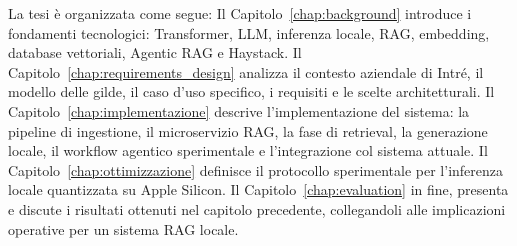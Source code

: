 La tesi è organizzata come segue: Il Capitolo~\ref{chap:background} introduce
i fondamenti tecnologici: Transformer, LLM, inferenza locale, RAG, embedding,
database vettoriali, Agentic RAG e Haystack. Il
Capitolo~\ref{chap:requirements_design} analizza il contesto aziendale di
Intré, il modello delle gilde, il caso d'uso specifico, i requisiti e le scelte
architetturali. Il Capitolo~\ref{chap:implementazione} descrive
l'implementazione del sistema: la pipeline di ingestione, il microservizio RAG,
la fase di retrieval, la generazione locale, il workflow agentico sperimentale e l'integrazione
col sistema attuale. Il Capitolo~\ref{chap:ottimizzazione} definisce il protocollo
sperimentale per l'inferenza locale quantizzata su Apple Silicon. Il
Capitolo~\ref{chap:evaluation} in fine, presenta e discute i risultati ottenuti nel capitolo precedente, collegandoli
alle implicazioni operative per un sistema RAG locale.

